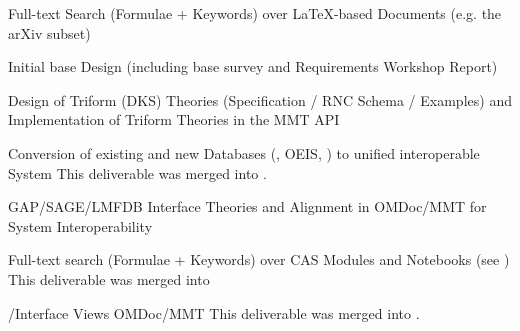 \begin{workpackage}[id=dksbases,%
  title=Data/Knowledge/Software-Bases,lead=FAU,
  ZHRM=12,JURM=12,FAURM=34,UWRM=25,SARM=10,LLRM=2,PSRM=25]
\begin{wpdelivs}
\begin{wpdeliv}[id=mws,miles=startup,due=9,nature=OTHER,dissem=PU,lead=JU,issue=133, status=delivered]
    {Full-text Search (Formulae + Keywords) over LaTeX-based Documents
      (e.g. the arXiv subset)}
  \end{wpdeliv}
  \begin{wpdeliv}[due=12,miles=startup,id=design,dissem=PU,nature=R,lead=JU,issue=136, status=delivered]
    {Initial \DKS base Design (including base survey and Requirements Workshop Report)}
  \end{wpdeliv}
  \begin{wpdeliv}[due=15,miles=proto1,id=dkstheories,dissem=PU,nature=R,lead=JU,issue=137, status=delivered]
    {Design of Triform (DKS) Theories (Specification / RNC Sche\-ma / Examples) and 
      Implementation of Triform Theories in the MMT API}
  \end{wpdeliv}
  \begin{wpdeliv}[due=24,id=conv,dissem=PU,nature=DEC,lead=ZH,issue=138,status=canceled]
    {Conversion of existing and new Databases (\LMFDB, OEIS, \FindStat) to unified interoperable
      System}
    This deliverable was merged into .
  \end{wpdeliv}
  \begin{wpdeliv}[due=24,id=psfoundation,dissem=PU,nature=OTHER,lead=FAU,issue=139,miles=proto1,status=delivered]
    {GAP/SAGE/LMFDB Interface Theories and Alignment in OMDoc/MMT for
      System Interoperability}
  \end{wpdeliv}
  \begin{wpdeliv}[id=notebooksearch,due=30,nature=OTHER,dissem=PU,lead=FAU,issue=140,status=canceled]
    {Full-text search (Formulae + Keywords) over CAS Modules and Notebooks} (see
      )
    This deliverable was merged into 
  \end{wpdeliv}
  \begin{wpdeliv}[due=36,id=pssem,dissem=PU,nature=OTHER,lead=FAU,issue=141,status=canceled]
    {\GAP/\Sage Interface Views OMDoc/MMT}
    This deliverable was merged into .
  \end{wpdeliv}

\end{wpdelivs}
\end{workpackage}
